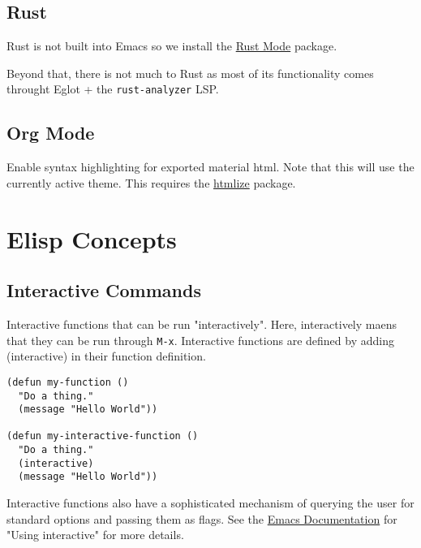 \documentclass[11pt]{article}
\begin{document}
\subsection{Rust}
\label{sec:org6fa19ec}

Rust is not built into Emacs so we install the \href{https://github.com/rust-lang/rust-mode/tree/25d91cff281909e9b7cb84e31211c4e7b0480f94}{Rust Mode} package.

Beyond that, there is not much to Rust as most of its functionality comes
throught Eglot + the \texttt{rust-analyzer} LSP.
\subsection{Org Mode}
\label{sec:orgf0b8752}

Enable syntax highlighting for exported material html. Note that this will use
the currently active theme. This requires the \href{https://elpa.nongnu.org/nongnu/htmlize.html}{htmlize} package.
\section{Elisp Concepts}
\label{sec:org6b02ce6}

\subsection{Interactive Commands}
\label{sec:org7db3818}

Interactive functions that can be run "interactively". Here, interactively maens
that they can be run through \texttt{M-x}. Interactive functions are defined by adding
(interactive) in their function definition.

\begin{verbatim}
(defun my-function ()
  "Do a thing."
  (message "Hello World"))

(defun my-interactive-function ()
  "Do a thing."
  (interactive)
  (message "Hello World"))
\end{verbatim}

Interactive functions also have a sophisticated mechanism of querying the user
for standard options and passing them as flags. See the \href{https://www.gnu.org/software/emacs/manual/html\_node/elisp/Using-Interactive.html}{Emacs Documentation} for
"Using interactive" for more details.
\end{document}
